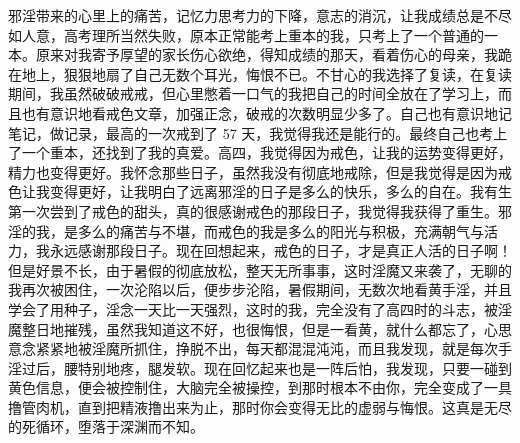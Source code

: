 \begin{case}
    邪淫带来的心里上的痛苦，记忆力思考力的下降，意志的消沉，让我成绩总是不尽如人意，高考理所当然失败，原本正常能考上重本的我，只考上了一个普通的一本。原来对我寄予厚望的家长伤心欲绝，得知成绩的那天，看着伤心的母亲，我跪在地上，狠狠地扇了自己无数个耳光，悔恨不已。不甘心的我选择了复读，在复读期间，我虽然破破戒戒，但心里憋着一口气的我把自己的时间全放在了学习上，而且也有意识地看戒色文章，加强正念，破戒的次数明显少多了。自己也有意识地记笔记，做记录，最高的一次戒到了 57 天，我觉得我还是能行的。最终自己也考上了一个重本，还找到了我的真爱。高四，我觉得因为戒色，让我的运势变得更好，精力也变得更好。我怀念那些日子，虽然我没有彻底地戒除，但是我觉得是因为戒色让我变得更好，让我明白了远离邪淫的日子是多么的快乐，多么的自在。我有生第一次尝到了戒色的甜头，真的很感谢戒色的那段日子，我觉得我获得了重生。邪淫的我，是多么的痛苦与不堪，而戒色的我是多么的阳光与积极，充满朝气与活力，我永远感谢那段日子。现在回想起来，戒色的日子，才是真正人活的日子啊！但是好景不长，由于暑假的彻底放松，整天无所事事，这时淫魔又来袭了，无聊的我再次被困住，一次沦陷以后，便步步沦陷，暑假期间，无数次地看黄手淫，并且学会了用种子，淫念一天比一天强烈，这时的我，完全没有了高四时的斗志，被淫魔整日地摧残，虽然我知道这不好，也很悔恨，但是一看黄，就什么都忘了，心思意念紧紧地被淫魔所抓住，挣脱不出，每天都混混沌沌，而且我发现，就是每次手淫过后，腰特别地疼，腿发软。现在回忆起来也是一阵后怕，我发现，只要一碰到黄色信息，便会被控制住，大脑完全被操控，到那时根本不由你，完全变成了一具撸管肉机，直到把精液撸出来为止，那时你会变得无比的虚弱与悔恨。这真是无尽的死循环，堕落于深渊而不知。


\end{case}
